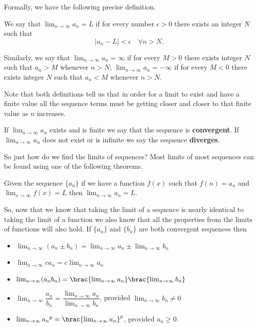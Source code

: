 Formally, we have the following precise definition.
\begin{definition}
We say that $\lim_{n\to\infty}a_n=L$ if for every number $\epsilon>0$ there exists an integer $N$ such that
\[ |a_n-L|<\epsilon \quad \forall n>N. \]

Similarly, we say that $\lim_{n\to\infty}a_n=\infty$ if for every $M>0$ there exists integer $N$ such that $a_n>M$ whenever $n>N$; $\lim_{n\to\infty}a_n=-\infty$ if for every $M<0$ there exists integer $N$ such that $a_n<M$ whenever $n>N$.
\end{definition}

Note that both definitions tell us that in order for a limit to exist and have a finite value all the sequence terms must be getting closer and closer to that finite value as $n$ increases.

If $\lim_{n\to\infty}a_n$ exists and is finite we say that the sequence is \textbf{convergent}. If $\lim_{n\to\infty}a_n$ does not exist or is infinite we say the sequence \textbf{diverges}.

So just how do we find the limits of sequences? Most limits of most sequences can be found using one of the following theorems.

\begin{theorem}
Given the sequence $\{a_n\}$ if we have a function $f(x)$ such that $f(n)=a_n$ and $\lim_{x\to\infty}f(x)=L$ then $\lim_{n\to\infty}a_n=L$.
\end{theorem}

So, now that we know that taking the limit of a sequence is nearly identical to taking the limit of a function we also know that all the properties from the limits of functions will also hold. If $\{a_n\}$ and $\{b_n\}$ are both convergent sequences then
\begin{itemize}
\item $\lim_{n\to\infty}(a_n\pm b_n)=\lim_{n\to\infty}a_n\pm\lim_{n\to\infty}b_n$
\item $\lim_{n\to\infty}ca_n=c\lim_{n\to\infty}a_n$
\item $\lim_{n\to\infty}(a_nb_n)=\brac{\lim_{n\to\infty}a_n}\brac{\lim_{n\to\infty}b_n}$
\item $\lim_{n\to\infty}\dfrac{a_n}{b_n}=\dfrac{\lim_{n\to\infty}a_n}{\lim_{n\to\infty}b_n}$, provided $\lim_{n\to\infty}b_n\neq0$
\item $\lim_{n\to\infty}{a_n}^p=\brac{\lim_{n\to\infty}a_n}^p$, provided $a_n\ge0$.
\end{itemize}


